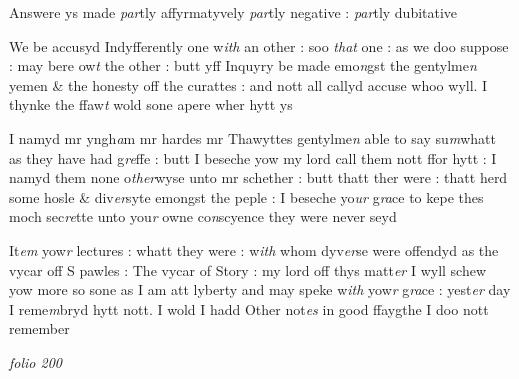 \documentclass[12pt, a4paper]{book}
\begin{document}
 
		\ifthenelse{\isodd{\thepage}}
		{\reversemarginpar}
		{\normalmarginpar}
		Answere ys made \textit{par}tly affyrmatyvely \textit{par}tly negative : \textit{par}tly dubitative

				\marginpar[\vspace{0.5cm}{\textcolor{Gray}{3}}]{}
			

		\ifthenelse{\isodd{\thepage}}
		{\reversemarginpar}
		{\normalmarginpar}
		 We be accusyd Indyfferently one w\textit{ith} an other : soo \textit{that} one : as we doo suppose : may bere ow\textit{t} the other : butt yff Inquyry be made emo\textit{n}gst the  gentylme\textit{n} yemen \& the honesty off the curattes : and nott all callyd accuse whoo wyll. I thynke the ffaw\textit{t} wold sone apere wher hytt ys 
      				
				\marginpar[\vspace{0.5cm}{\textcolor{Gray}{Thatys}}]{}
			
      					
		\ifthenelse{\isodd{\thepage}}
		{\reversemarginpar}
		{\normalmarginpar}
		I namyd mr yngh\textit{a}m mr hardes mr Thawyttes gentylme\textit{n} able to say su\textit{m}whatt as they have had g\textit{re}ffe : butt I beseche yow my lord call them nott ffor hytt : I namyd them none o\textit{ther}wyse unto mr schether : butt thatt ther  were : thatt herd some hosle \& div\textit{er}syte emongst the peple : I beseche yo\textit{ur}  g\textit{ra}ce to kepe thes moch sec\textit{re}tte unto you\textit{r} owne co\textit{n}scyence they were never seyd 

	
				\marginpar[\vspace{0.5cm}{\textcolor{Gray}{4}}]{}
			


		\ifthenelse{\isodd{\thepage}}
		{\reversemarginpar}
		{\normalmarginpar}
		It\textit{em} yow\textit{r} lectures : whatt they were : w\textit{ith }whom dyv\textit{er}se were offendyd as the vycar off S pawles : The vycar of Story : my lord off thys matt\textit{er} I wyll schew yow more so sone as I am att lyberty and may speke w\textit{ith} yow\textit{r} g\textit{ra}ce : yest\textit{er} day I reme\textit{m}bryd hytt nott. I wold I hadd Other not\textit{es} in good ffaygthe I doo nott remember 
      				
\dotfill
						\newpage
{}

\textit{folio 200}
      				
      				
      				\vspace*{4cm}
      				
\dotfill
						  \section*{}
\end{document}

